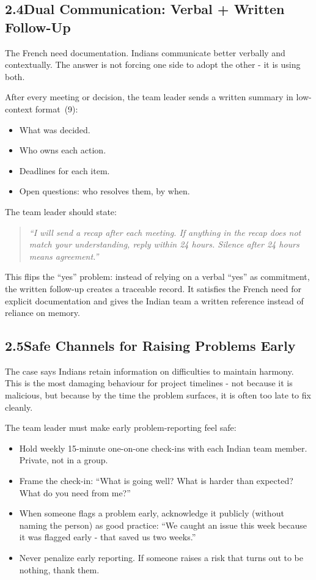 \documentclass[12pt, a4paper]{article}
\begin{document}
\subsection*{2.4\quad Dual Communication: Verbal + Written Follow-Up}

The French need documentation. Indians communicate better verbally and contextually. The answer is not forcing one side to adopt the other - it is using both.

After every meeting or decision, the team leader sends a written summary in low-context format~(9):
\begin{itemize}[noitemsep]
    \item What was decided.
    \item Who owns each action.
    \item Deadlines for each item.
    \item Open questions: who resolves them, by when.
\end{itemize}

The team leader should state:
\begin{quote}
\textit{``I will send a recap after each meeting. If anything in the recap does not match your understanding, reply within 24 hours. Silence after 24 hours means agreement.''}
\end{quote}

This flips the ``yes'' problem: instead of relying on a verbal ``yes'' as commitment, the written follow-up creates a traceable record. It satisfies the French need for explicit documentation and gives the Indian team a written reference instead of reliance on memory.

\subsection*{2.5\quad Safe Channels for Raising Problems Early}

The case says Indians retain information on difficulties to maintain harmony. This is the most damaging behaviour for project timelines - not because it is malicious, but because by the time the problem surfaces, it is often too late to fix cleanly.

The team leader must make early problem-reporting feel safe:
\begin{itemize}[noitemsep]
    \item Hold weekly 15-minute one-on-one check-ins with each Indian team member. Private, not in a group.
    \item Frame the check-in: ``What is going well? What is harder than expected? What do you need from me?''
    \item When someone flags a problem early, acknowledge it publicly (without naming the person) as good practice: ``We caught an issue this week because it was flagged early - that saved us two weeks.''
    \item Never penalize early reporting. If someone raises a risk that turns out to be nothing, thank them.
\end{itemize}
\end{document}
